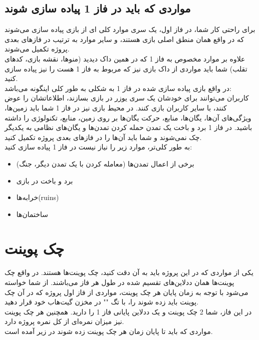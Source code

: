 \documentclass[]{article}
\begin{document}
\subsection*{\titr مواردی که باید در فاز 1 پیاده سازی شوند}
برای راحتی کار شما، در فاز اول، یک سری موارد کلی ای از بازی پیاده سازی می‌شوند که در واقع همان منطق اصلی بازی هستند، و سایر موارد به ترتیب در فازهای بعدی پروژه تکمیل می‌شوند.\\
علاوه بر موارد مخصوص به فاز 1 که در همین داک دیدید (منوها، نقشه بازی، کدهای تقلب) شما باید مواردی از داک بازی نیز که مربوط به فاز 1 هست را نیز پیاده سازی کنید.\\
در واقع بازی پیاده سازی شده در فاز 1 به شکلی به طور کلی اینگونه می‌باشد:\\
کاربران می‌توانند برای خودشان یک سری یوزر در بازی بسازند، اطلاعاتشان را عوض کنند، با سایر کاربران بازی کنند. در محیط بازی نیز در فاز 1 شما باید زمین‌ها، ویژگی‌های آن‌ها، یگان‌ها، منابع، حرکت یگان‌ها بر روی زمین، منابع، تکنولوژی را داشته باشید. در فاز 1 برد و باخت یک تمدن  حمله کردن تمدن‌ها و یگان‌های نظامی به یکدیگر چک نمی‌شوند و شما باید آن‌ها را در فازهای بعدی پروژه تکمیل کنید.\\
به طور کلی‌تر، موارد زیر را نیاز نیست در فاز 1 پیاده سازی کنید:
\begin{itemize}
    \item برخی از اعمال تمدن‌ها (معامله کردن با یک تمدن دیگر، جنگ)
    \item برد و باخت در بازی
    \item خرابه‌ها(ruins)
    \item ساختمان‌ها
\end{itemize}

\section*{\titr چک پوینت}

یکی از مواردی که در این پروژه باید به آن دقت کنید، چک پوینت‌ها هستند. در واقع چک پوینت‌ها همان ددلاین‌های تقسیم شده در طول هر فاز می‌باشند. از شما خواسته می‌شود با توجه به زمان پایان هر چک پوینت، مواردی از فاز اول پروژه که در آن چک پوینت باید زده شوند را، با تگ "" در مخزن گیت‌هاب خود قرار دهید.\\
در این فاز، شما 2 چک پوینت و یک ددلاین پایانی فاز 1 را دارید. همچنین هر چک پوینت نیز میزان نمره‌ای از کل نمره پروژه دارد.\\
مواردی که باید تا پایان زمان هر چک پوینت زده شوند در زیر آمده است.
\end{document}
